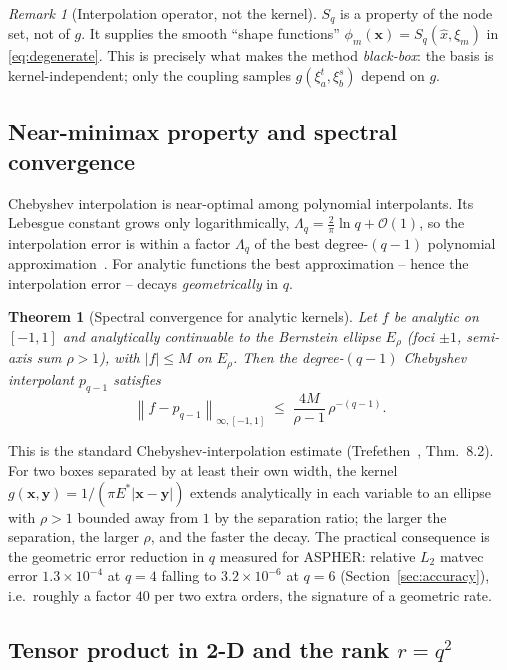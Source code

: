 \documentclass[11pt,a4paper]{article}
\newcommand{\Es}{E^{*}}
\newcommand{\Order}{\mathcal{O}}
\newcommand{\norm}[1]{\left\lVert #1 \right\rVert}
\newcommand{\abs}[1]{\left\lvert #1 \right\rvert}
\newcommand{\xx}{\mathbf{x}}
\newcommand{\yy}{\mathbf{y}}
\newtheorem{theorem}{Theorem}
\theoremstyle{definition}
\theoremstyle{remark}
\newtheorem{remark}{Remark}
\begin{document}
\begin{remark}[Interpolation operator, not the kernel]
$S_q$ is a property of the node set, not of $g$. It supplies the smooth
``shape functions'' $\phi_m(\xx)=S_q(\hat x,\xi_m)$ in \eqref{eq:degenerate}.
This is precisely what makes the method \emph{black-box}: the basis is
kernel-independent; only the coupling samples $g(\xi_a^t,\xi_b^s)$ depend on $g$.
\end{remark}

\subsection{Near-minimax property and spectral convergence}

Chebyshev interpolation is near-optimal among polynomial interpolants. Its
Lebesgue constant grows only logarithmically,
$\Lambda_q = \tfrac{2}{\pi}\ln q + \Order(1)$, so the interpolation error is
within a factor $\Lambda_q$ of the best degree-$(q{-}1)$ polynomial
approximation~\cite{Trefethen2013}. For analytic functions the best
approximation -- hence the interpolation error -- decays \emph{geometrically} in
$q$.

\begin{theorem}[Spectral convergence for analytic kernels]
\label{thm:cheb-conv}
Let $f$ be analytic on $[-1,1]$ and analytically continuable to the Bernstein
ellipse $E_\rho$ (foci $\pm1$, semi-axis sum $\rho>1$), with $\abs{f}\le M$ on
$E_\rho$. Then the degree-$(q{-}1)$ Chebyshev interpolant $p_{q-1}$ satisfies
\begin{equation}
  \norm{f-p_{q-1}}_{\infty,[-1,1]} \;\le\; \frac{4M}{\rho-1}\,\rho^{-(q-1)}.
  \label{eq:cheb-bound}
\end{equation}
\end{theorem}
This is the standard Chebyshev-interpolation estimate
(Trefethen~\cite{Trefethen2013}, Thm.~8.2). For two boxes separated by at least
their own width, the kernel $g(\xx,\yy)=1/(\pi\Es\abs{\xx-\yy})$ extends
analytically in each variable to an ellipse with $\rho>1$ bounded away from $1$
by the separation ratio; the larger the separation, the larger $\rho$, and the
faster the decay. The practical consequence is the geometric error reduction in
$q$ measured for ASPHER: relative $L_2$ matvec error
$1.3\times10^{-4}$ at $q=4$ falling to $3.2\times10^{-6}$ at $q=6$
(Section~\ref{sec:accuracy}), i.e.\ roughly a factor $40$ per two extra orders,
the signature of a geometric rate.

\subsection{Tensor product in 2-D and the rank $r=q^2$}
\end{document}
